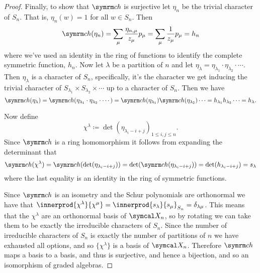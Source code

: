 \begin{thm}{}{}
\begin{proof}
        Finally, to show that \(\ch\) is surjective let \(\eta_n\) be the trivial character of \(S_n\).
        That is, \(\eta_n(w) = 1\) for all \(w \in S_n\).
        Then
        \begin{equation}
            \ch(\eta_n) = \sum_\mu \frac{\eta_{n,\mu}}{z_\mu} p_\mu = \sum_\mu \frac{1}{z_\mu} p_\mu = h_n
        \end{equation}
        where we've used an identity in the ring of functions to identify the complete symmetric function, \(h_n\).
        Now let \(\lambda\) be a partition of \(n\) and let \(\eta_\lambda = \eta_{\lambda_1} \cdot \eta_{\lambda_2} \cdot \dotsb\).
        Then \(\eta_\lambda\) is a character of \(S_n\), specifically, it's the character we get inducing the trivial character of \(S_{\lambda_1} \times S_{\lambda_2} \times \dotsb\) up to a character of \(S_n\).
        Then we have
        \begin{equation}
            \ch(\eta_\lambda) = \ch(\eta_{\lambda_1} \cdot \eta_{\lambda_2} \cdot \dotsm) = \ch(\eta_{\lambda_1}) \ch(\eta_{\lambda_2}) \dotsm = h_{\lambda_1} h_{\lambda_2} \dotsm = h_\lambda.
        \end{equation}
        
        Now define
        \begin{equation}
            \chi^\lambda \coloneq \det(\eta_{\lambda_i - i + j})_{1 \le i , j \le n}.
        \end{equation}
        Since \(\ch\) is a ring homomorphism it follows from expanding the determinant that
        \begin{equation}
            \ch(\chi^\lambda) = \ch(\det(\eta_{\lambda_i - i + j})) = \det(\ch(\eta_{\lambda_i - i + j})) = \det(h_{\lambda_i - i + j}) = s_\lambda
        \end{equation}
        where the last equality is an identity in the ring of symmetric functions.
        
        Since \(\ch\) is an isometry and the Schur polynomials are orthonormal we have that \(\innerprod{\chi^\lambda}{\chi^\mu} = \innerprod{s_\lambda}{s_\mu}_{S_n} = \delta_{\lambda\mu}\).
        This means that the \(\chi^\lambda\) are an orthonormal basis of \(\classFunctions_n\), so by rotating we can take them to be exactly the irreducible characters of \(S_n\).
        Since the number of irreducible characters of \(S_n\) is exactly the number of partitions of \(n\) we have exhausted all options, and so \(\{\chi^\lambda\}\) is a basis of \(\classFunctions_n\).
        Therefore \(\ch\) maps a basis to a basis, and thus is surjective, and hence a bijection, and so an isomorphism of graded algebras.
    \end{proof}
\end{thm}

